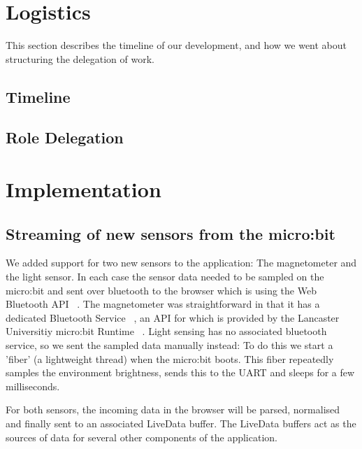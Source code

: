 \documentclass{article}
\begin{document}
\section{Logistics}%
\label{sec:logistics}

This section describes the timeline of our development, and how we went about structuring the delegation of work.

\subsection{Timeline}%
\label{subsec:timeline}


\subsection{Role Delegation}%
\label{subsec:delegation}

\section{Implementation}%
\label{sec:implementation}

\subsection{Streaming of new sensors from the micro:bit}%
\label{subsec:streaming}
We added support for two new sensors to the application: The magnetometer and the light sensor. In each case the sensor data needed to be sampled on the micro:bit and sent over bluetooth to the browser which is using the Web Bluetooth API ~\cite{bluetoothapi}. The magnetometer was straightforward in that it has a dedicated Bluetooth Service ~\cite{microbitservices}, an API for which is provided by the Lancaster Universitiy micro:bit Runtime ~\cite{magnetometerservice}. Light sensing has no associated bluetooth service, so we sent the sampled data manually instead: To do this we start a 'fiber' (a lightweight thread) when the micro:bit boots. This fiber repeatedly samples the environment brightness, sends this to the UART and sleeps for a few milliseconds.

For both sensors, the incoming data in the browser will be parsed, normalised and finally sent to an associated LiveData buffer. The LiveData buffers act as the sources of data for several other components of the application.
\end{document}
